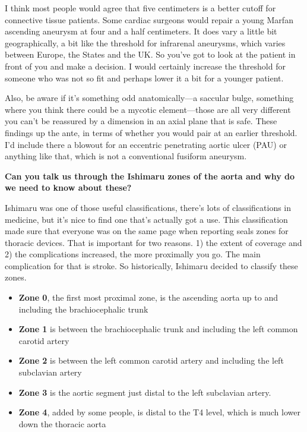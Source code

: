 \documentclass[
]{book}
\begin{document}
I think most people would agree that five centimeters is a better cutoff
for connective tissue patients. Some cardiac surgeons would repair a
young Marfan ascending aneurysm at four and a half centimeters. It does
vary a little bit geographically, a bit like the threshold for
infrarenal aneurysms, which varies between Europe, the States and the
UK. So you've got to look at the patient in front of you and make a
decision. I would certainly increase the threshold for someone who was
not so fit and perhaps lower it a bit for a younger patient.

Also, be aware if it's something odd anatomically---a saccular bulge,
something where you think there could be a mycotic element---those are
all very different you can't be reassured by a dimension in an axial
plane that is safe. These findings up the ante, in terms of whether you
would pair at an earlier threshold. I'd include there a blowout for an
eccentric penetrating aortic ulcer (PAU) or anything like that, which is
not a conventional fusiform aneurysm.

\textbf{Can you talk us through the Ishimaru zones of the aorta and why do we
need to know about these?}

Ishimaru was one of those useful classifications, there's lots of
classifications in medicine, but it's nice to find one that's actually
got a use. This classification made sure that everyone was on the same
page when reporting seals zones for thoracic devices. That is important
for two reasons. 1) the extent of coverage and 2) the complications
increased, the more proximally you go. The main complication for that is
stroke. So historically, Ishimaru decided to classify these zones.

\begin{itemize}
\item
  \textbf{Zone 0}, the first most proximal zone, is the ascending aorta up
  to and including the brachiocephalic trunk
\item
  \textbf{Zone 1} is between the brachiocephalic trunk and including the
  left common carotid artery
\item
  \textbf{Zone 2} is between the left common carotid artery and including
  the left subclavian artery
\item
  \textbf{Zone 3} is the aortic segment just distal to the left subclavian
  artery.
\item
  \textbf{Zone 4}, added by some people, is distal to the T4 level, which
  is much lower down the thoracic aorta
\end{itemize}
\end{document}
